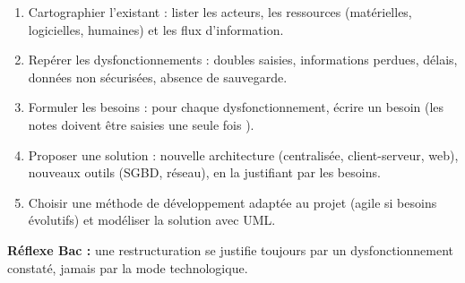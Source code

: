 \documentclass[11pt]{article}
\newcommand{\cle}[1]{{\popxbold\color{popdark}#1}}
\begin{document}
\begin{methode}
\begin{enumerate}
  \item \cle{Cartographier l'existant} : lister les acteurs, les ressources (matérielles, logicielles, humaines) et les flux d'information.
  \item \cle{Repérer les dysfonctionnements} : doubles saisies, informations perdues, délais, données non sécurisées, absence de sauvegarde.
  \item \cle{Formuler les besoins} : pour chaque dysfonctionnement, écrire un besoin (\og les notes doivent être saisies une seule fois \fg{}).
  \item \cle{Proposer une solution} : nouvelle architecture (centralisée, client-serveur, web), nouveaux outils (SGBD, réseau), en la justifiant par les besoins.
  \item \cle{Choisir une méthode de développement} adaptée au projet (agile si besoins évolutifs) et modéliser la solution avec UML.
\end{enumerate}
\textbf{Réflexe Bac :} une restructuration se justifie toujours par un dysfonctionnement constaté, jamais par la mode technologique.
\end{methode}
\end{document}
